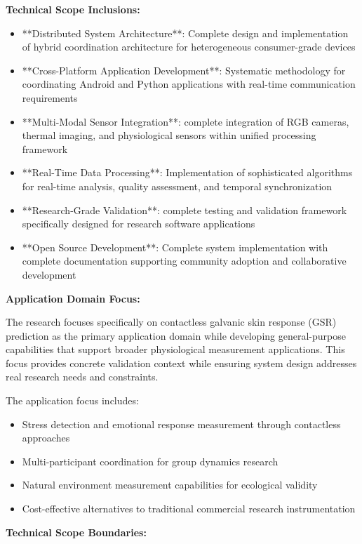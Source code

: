 \documentclass[11pt,a4paper]{article}
\begin{document}
\textbf{Technical Scope Inclusions:}

\begin{itemize}
\item **Distributed System Architecture**: Complete design and implementation of
hybrid coordination architecture for
  heterogeneous consumer-grade devices
\item **Cross-Platform Application Development**: Systematic methodology for
coordinating Android and Python applications
  with real-time communication requirements
\item **Multi-Modal Sensor Integration**: complete integration of RGB cameras,
thermal imaging, and physiological
  sensors within unified processing framework
\item **Real-Time Data Processing**: Implementation of sophisticated algorithms
for real-time analysis, quality assessment,
  and temporal synchronization
\item **Research-Grade Validation**: complete testing and validation framework
specifically designed for research
  software applications
\item **Open Source Development**: Complete system implementation with complete
documentation supporting community
  adoption and collaborative development

\end{itemize}
\textbf{Application Domain Focus:}

The research focuses specifically on contactless galvanic skin response (GSR)
prediction as the primary application
domain while developing general-purpose capabilities that support broader
physiological measurement applications. This
focus provides concrete validation context while ensuring system design
addresses real research needs and constraints.

The application focus includes:

\begin{itemize}
\item Stress detection and emotional response measurement through contactless
approaches
\item Multi-participant coordination for group dynamics research
\item Natural environment measurement capabilities for ecological validity
\item Cost-effective alternatives to traditional commercial research
instrumentation

\end{itemize}
\textbf{Technical Scope Boundaries:}
\end{document}
